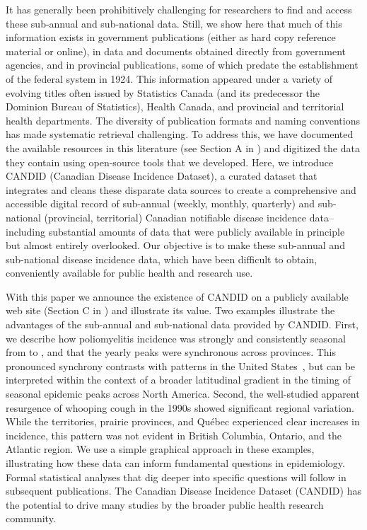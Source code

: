 \documentclass[10pt,letterpaper]{article}
\begin{document}
It has generally been prohibitively challenging for researchers to find and access these sub-annual and sub-national data. Still, we show here that much of this information exists in government publications (either as hard copy reference material or online), in data and documents obtained directly from government agencies, and in provincial publications, some of which predate the establishment of the federal system in 1924. This information appeared under a variety of evolving titles often issued by Statistics Canada (and its predecessor the Dominion Bureau of Statistics), Health Canada, and provincial and territorial health departments. The diversity of publication formats and naming conventions has made systematic retrieval challenging. To address this, we have documented the available resources in this literature (see Section A in ) and digitized the data they contain using open-source tools that we developed. Here, we introduce CANDID (Canadian Disease Incidence Dataset), a curated dataset that integrates and cleans these disparate data sources to create a comprehensive and accessible digital record of sub-annual (weekly, monthly, quarterly) and sub-national (provincial, territorial) Canadian notifiable disease incidence data--including substantial amounts of data that were publicly available in principle but almost entirely overlooked. Our objective is to make these sub-annual and sub-national disease incidence data, which have been difficult to obtain, conveniently available for public health and research use.

With this paper we announce the existence of CANDID on a publicly available web site (Section C in ) and illustrate its value. Two examples illustrate the advantages of the sub-annual and sub-national data provided by CANDID. First, we describe how poliomyelitis incidence was strongly and consistently seasonal from  to , and that the yearly peaks were synchronous across provinces. This pronounced synchrony contrasts with patterns in the United States~\cite{martinez2015unraveling}, but can be interpreted within the context of a broader latitudinal gradient in the timing of seasonal epidemic peaks across North America. Second, the well-studied apparent resurgence of whooping cough in the 1990s showed significant regional variation. While the territories, prairie provinces, and Qu\'ebec experienced clear increases in incidence, this pattern was not evident in British Columbia, Ontario, and the Atlantic region. We use a simple graphical approach in these examples, illustrating how these data can inform fundamental questions in epidemiology. Formal statistical analyses that dig deeper into specific questions will follow in subsequent publications. The Canadian Disease Incidence Dataset (CANDID) has the potential to drive many studies by the broader public health research community.
\end{document}
